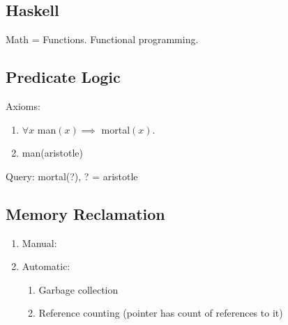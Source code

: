 \documentclass[12pt]{article}
\begin{document}
	\subsection{Haskell}
	Math = Functions. Functional programming.
	
	\subsection{Predicate Logic}
	Axioms: \begin{enumerate}
		\item $\forall x$ man$(x) \implies$ mortal$(x)$.
		\item man(aristotle)
	\end{enumerate}
	Query: mortal(?), ? = aristotle
	
	\subsection{Memory Reclamation}
	\begin{enumerate}
		\item Manual: 
		\item Automatic: \begin{enumerate}
			\item Garbage collection
			\item Reference counting (pointer has count of references to it)
		\end{enumerate}
	\end{enumerate}
	
	
	
\end{document}
